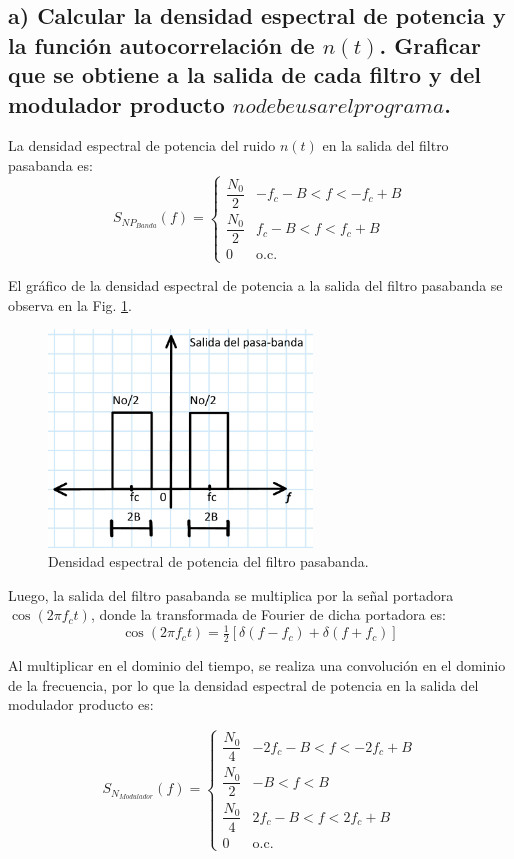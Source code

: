 \subsection*{a) Calcular la densidad espectral de potencia y la función autocorrelación de $n(t)$. Graficar que se obtiene a la salida 
de cada filtro y del modulador producto \(no debe usar el programa\).} \par

	La densidad espectral de potencia del ruido $n(t)$ en la salida del filtro pasabanda es:
		\[
			S_{NP_{Banda}}(f) =
			\begin{cases}
			\dfrac{N_0}{2} & -f_c - B < f < -f_c + B \\[6pt]
			\dfrac{N_0}{2} & f_c - B < f < f_c + B \\[6pt]
			0 & \text{o.c.}
			\end{cases}
		\]

	El gráfico de la densidad espectral de potencia a la salida del filtro pasabanda se observa en la Fig. \ref{fig:6pasabanda}.

		\begin{figure}[H]
			\centering
			\includegraphics[width=7cm]{imagenes/Actividad_6/actividad6_pasabanda.jpg}
			\caption{Densidad espectral de potencia del filtro pasabanda.}
			\label{fig:6pasabanda}
		\end{figure}


	Luego, la salida del filtro pasabanda se multiplica por la señal portadora $\cos(2 \pi f_c t)$, donde la transformada de 
	Fourier de dicha portadora es:
		\[
			\cos(2 \pi f_c t) = \tfrac{1}{2} \left[ \delta(f - f_c) + \delta(f + f_c) \right]
		\]
	
	Al multiplicar en el dominio del tiempo, se realiza una convolución en el dominio de la frecuencia, por lo que la densidad espectral de potencia en la 
	salida del modulador producto es:

		\[
			S_{N_{Modulador}}(f) =
			\begin{cases}
			\dfrac{N_0}{4} & -2f_c - B < f < -2f_c + B \\[6pt]
			\dfrac{N_0}{2} & -B < f < B \\[6pt]
			\dfrac{N_0}{4} & 2f_c - B < f < 2f_c + B \\[6pt]
			0 & \text{o.c.}
			\end{cases}
		\]
	
